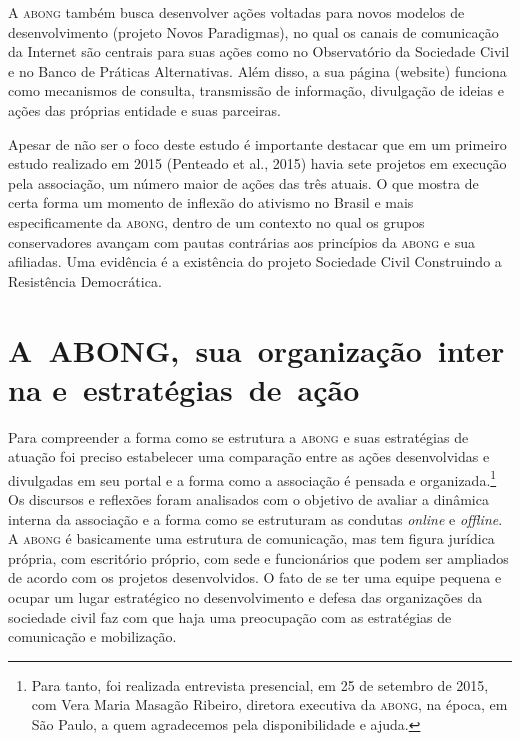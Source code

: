 A \textsc{abong} também busca desenvolver ações voltadas para novos modelos de
desenvolvimento (projeto Novos Paradigmas), no qual os canais de
comunicação da Internet são centrais para suas ações como no
Observatório da Sociedade Civil e no Banco de Práticas Alternativas.
Além disso, a sua página (website) funciona como mecanismos de consulta,
transmissão de informação, divulgação de ideias e ações das próprias
entidade e suas parceiras.

Apesar de não ser o foco deste estudo é importante destacar que em um
primeiro estudo realizado em 2015 (Penteado et al., 2015) havia sete
projetos em execução pela associação, um número maior de ações das três
atuais. O que mostra de certa forma um momento de inflexão do ativismo
no Brasil e mais especificamente da \textsc{abong}, dentro de um contexto no qual
os grupos conservadores avançam com pautas contrárias aos princípios da
\textsc{abong} e sua afiliadas. Uma evidência é a existência do projeto Sociedade
Civil Construindo a Resistência Democrática.

\section{A~ABONG,~sua~organização~interna e~estratégias~de~ação}

Para compreender a forma como se estrutura a \textsc{abong} e suas estratégias de
atuação foi preciso estabelecer uma comparação entre as ações
desenvolvidas e divulgadas em seu portal e a forma como a associação é
pensada e organizada.\footnote{Para tanto, foi realizada entrevista
  presencial, em 25 de setembro de 2015, com Vera Maria Masagão Ribeiro,
  diretora executiva da \textsc{abong}, na época, em São Paulo, a quem
  agradecemos pela disponibilidade e ajuda.} Os discursos e reflexões
foram analisados com o objetivo de avaliar a dinâmica interna da
associação e a forma como se estruturam as condutas \emph{online} e \emph{offline}.
A \textsc{abong} é basicamente uma estrutura de comunicação, mas tem figura
jurídica própria, com escritório próprio, com sede e funcionários que
podem ser ampliados de acordo com os projetos desenvolvidos. O fato de
se ter uma equipe pequena e ocupar um lugar estratégico no
desenvolvimento e defesa das organizações da sociedade civil faz com que
haja uma preocupação com as estratégias de comunicação e mobilização.

